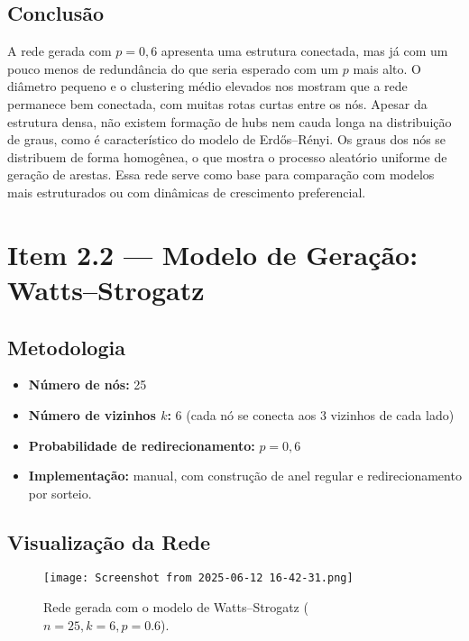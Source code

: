 \documentclass{article}
\begin{document}
\subsection*{Conclusão}

A rede gerada com \( p = 0{,}6 \) apresenta uma estrutura conectada, mas já com um pouco menos de redundância do que seria esperado com um \( p \) mais alto. O diâmetro pequeno e o clustering médio elevados nos mostram que a rede permanece bem conectada, com muitas rotas curtas entre os nós.
Apesar da estrutura densa, não existem formação de hubs nem cauda longa na distribuição de graus, como é característico do modelo de Erdős–Rényi. Os graus dos nós se distribuem de forma homogênea, o que mostra o processo aleatório uniforme de geração de arestas. Essa rede serve como base para comparação com modelos mais estruturados ou com dinâmicas de crescimento preferencial.


\section*{Item 2.2 — Modelo de Geração: Watts–Strogatz}

\subsection*{Metodologia}

\begin{itemize}
    \item \textbf{Número de nós:} 25
    \item \textbf{Número de vizinhos \( k \):} 6 (cada nó se conecta aos 3 vizinhos de cada lado)
    \item \textbf{Probabilidade de redirecionamento:} \( p = 0{,}6 \)
    \item \textbf{Implementação:} manual, com construção de anel regular e redirecionamento por sorteio.
\end{itemize}

\subsection*{Visualização da Rede}

\begin{figure}[h]
\centering
\texttt{[image: Screenshot from 2025-06-12 16-42-31.png]}
\caption{Rede gerada com o modelo de Watts–Strogatz (\(n=25, k=6, p=0.6\)).}
\end{figure}
\end{document}
